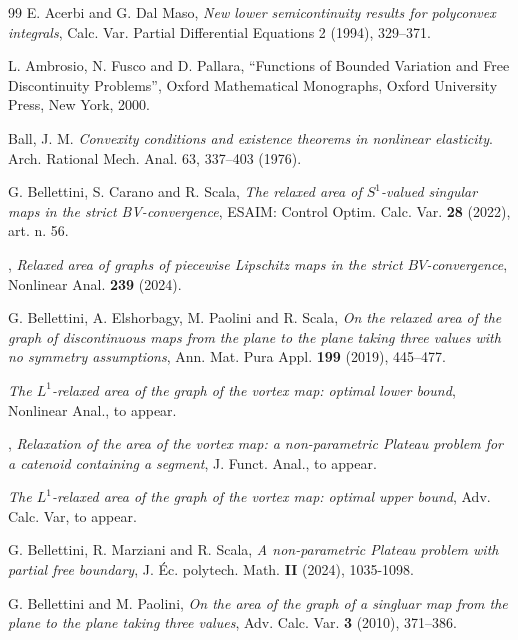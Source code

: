 \documentclass[a4paper,11pt]{article}
\numberwithin{equation}{section}
\begin{document}
\begin{thebibliography}{99}
%
% 
 E. Acerbi and G. Dal Maso, {\it New lower semicontinuity results for polyconvex integrals}, Calc.
Var. Partial Differential Equations 2 (1994), 329--371.

L. Ambrosio, N. Fusco and D. Pallara, ``Functions of Bounded Variation and
Free Discontinuity Problems'', Oxford Mathematical
Monographs, Oxford University Press, New York, 2000.

 Ball, J. M. {\it Convexity conditions and existence theorems in nonlinear elasticity}. Arch. Rational Mech. Anal. 63, 337--403 (1976).

 G. Bellettini, S. Carano and R. Scala, 
\emph{The relaxed area of $S^1$-valued singular maps in the strict BV-convergence},
ESAIM: Control Optim. Calc. Var. {\bf 28} (2022), art. n. 56.

,
{\it Relaxed area of graphs of piecewise Lipschitz maps in the strict $BV$-convergence},
Nonlinear Anal. {\bf 239} (2024).

 G. Bellettini, A. Elshorbagy, M. Paolini and R. Scala, 
\emph{On the relaxed area of the graph of discontinuous maps from the
	plane to the plane taking three values with no symmetry assumptions},
Ann. Mat. Pura Appl. \textbf{199} (2019), 445--477.



{\it The $L^1$-relaxed area of the graph of the vortex map: optimal 
	lower bound}, 
Nonlinear Anal., to appear. 

,
{\it Relaxation of the area of the vortex map: 
	a non-parametric Plateau problem for a catenoid containing a segment}, 
J. Funct. Anal., to appear.

{\it The $L^1$-relaxed area of the graph of the vortex map: optimal 
	upper bound}, 
Adv. Calc. Var, to appear. 

G. Bellettini, R. Marziani and R. Scala, \emph{A non-parametric Plateau problem with partial free
	boundary}, 
J. \'Ec. polytech. Math. {\bf II} (2024), 1035-1098.

 G. Bellettini and M. Paolini,
\emph{On the area of the graph of a singluar map from the plane to the plane taking three values},
Adv. Calc. Var. \textbf{3} (2010), 371--386.


\end{thebibliography}
\end{document}
